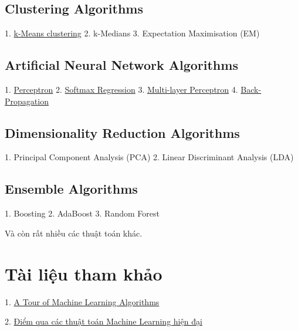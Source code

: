  
\subsection{Clustering Algorithms}
 
1. \href{http://machinelearningcoban.com/2017/01/01/kmeans/}{k-Means clustering}  
2. k-Medians  
3. Expectation Maximisation (EM)  
 
 
\subsection{Artificial Neural Network Algorithms }
 
1. \href{http://machinelearningcoban.com/2017/01/21/perceptron/}{Perceptron} 
2. \href{http://machinelearningcoban.com/2017/02/17/softmax/}{Softmax Regression} 
3. \href{http://machinelearningcoban.com/2017/02/24/mlp/}{Multi-layer Perceptron} 
4. \href{http://machinelearningcoban.com/2017/02/24/mlp/#-backpropagation}{Back-Propagation } 
 
 
\subsection{Dimensionality Reduction Algorithms }
 
1. Principal Component Analysis (PCA) 
2. Linear Discriminant Analysis (LDA) 
 
 
\subsection{Ensemble Algorithms }
 
1. Boosting 
2. AdaBoost  
3. Random Forest  
 
Và còn rất nhiều các thuật toán khác.  
 
 
\section{Tài liệu tham khảo }
1. \href{http://machinelearningmastery.com/a-tour-of-machine-learning-algorithms/}{A Tour of Machine Learning Algorithms} 
 
2. \href{https://ongxuanhong.wordpress.com/2015/10/22/diem-qua-cac-thuat-toan-machine-learning-hien-dai/}{Điểm qua các thuật toán Machine Learning hiện đại} 
 
 
